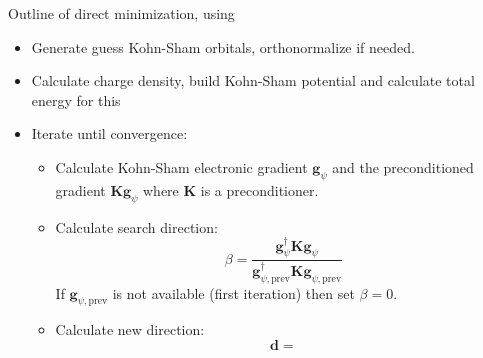 Outline of direct minimization, using 
\begin{itemize}
\item Generate guess Kohn-Sham orbitals, orthonormalize if needed.
\item Calculate charge density, build Kohn-Sham potential and calculate total energy
for this
\item Iterate until convergence:
%
\begin{itemize}
%
\item Calculate Kohn-Sham electronic gradient $\mathbf{g}_{\psi}$ and the preconditioned
gradient $\mathbf{Kg}_{\psi}$ where $\mathbf{K}$ is a preconditioner.
%
\item Calculate search direction:
\begin{equation}
\beta = \dfrac{\mathbf{g}_{\psi}^{\dagger}\mathbf{Kg}_{\psi}}
{\mathbf{g}_{\psi,\mathrm{prev}}^{\dagger}\mathbf{Kg}_{\psi,\mathrm{prev}}}
\end{equation}
If $\mathbf{g}_{\psi,\mathrm{prev}}$ is not available (first iteration) then set
$\beta = 0$.
%
\item Calculate new direction:
\begin{equation}
\mathbf{d} = 
\end{equation}
\end{itemize}
%
\end{itemize}
